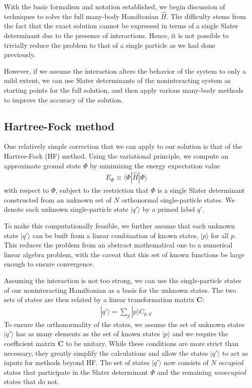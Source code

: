 With the basic formalism and notation established, we begin discussion of techniques to solve the full many-body Hamiltonian $\hat H$.  The difficulty stems from the fact that the exact solution cannot be expressed in terms of a single Slater determinant due to the presence of interactions.  Hence, it is not possible to trivially reduce the problem to that of a single particle as we had done previously.

However, if we assume the interaction alters the behavior of the system to only a mild extent, we can use Slater determinants of the noninteracting system as starting points for the full solution, and then apply various many-body methods to improve the accuracy of the solution.

\subsection{Hartree-Fock method}
\label{subsec:HartreeFockmethod}

One relatively simple correction that we can apply to our solution is that of the Hartree-Fock (HF) method.  Using the variational principle, we compute an approximate ground state $\Phi$ by minimizing the energy expectation value
\begin{align*}
  E_{\Phi} \equiv \langle \Phi | \hat H | \Phi \rangle
\end{align*}
with respect to $\Phi$, subject to the restriction that $\Phi$ is a single Slater determinant constructed from an unknown set of $N$ orthonormal single-particle states.  We denote each unknown single-particle state $|q'\rangle$ by a primed label $q'$.

To make this computationally feasible, we further assume that each unknown state $|q'\rangle$ can be built from a linear combination of known states, $|p\rangle$ for all $p$.  This reduces the problem from an abstract mathematical one to a numerical linear algebra problem, with the caveat that this set of known functions be large enough to ensure convergence.

Assuming the interaction is not too strong, we can use the single-particle states of our noninteracting Hamiltonian as a basis for the unknown states.  The two sets of states are then related by a linear transformation matrix $\bm C$:
\begin{align*}
  |q'\rangle = \sum_p |p\rangle C_{p, q'}
\end{align*}
To ensure the orthonormality of the states, we assume the set of unknown states $|q'\rangle$ has as many elements as the set of known states $|p\rangle$ and we require the coefficient matrix $\bm C$ to be unitary.  While these conditions are more strict than necessary, they greatly simplify the calculations and allow the states $|q'\rangle$ to act as inputs for methods beyond HF.  The set of states $|q'\rangle$ now consists of $N$ \textit{occupied} states that participate in the Slater determinant $\Phi$ and the remaining \textit{unoccupied} states that do not.

